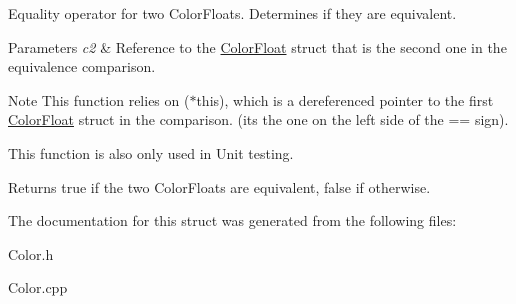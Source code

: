 Equality operator for two Color\+Floats. Determines if they are equivalent. 
\begin{DoxyParams}{Parameters}
{\em c2} & Reference to the \hyperlink{structtsgl_1_1_color_float}{Color\+Float} struct that is the second one in the equivalence comparison. \\
\hline
\end{DoxyParams}
\begin{DoxyNote}{Note}
This function relies on ($\ast$this), which is a dereferenced pointer to the first \hyperlink{structtsgl_1_1_color_float}{Color\+Float} struct in the comparison. (its the one on the left side of the == sign). 

This function is also only used in Unit testing. 
\end{DoxyNote}
\begin{DoxyReturn}{Returns}
true if the two Color\+Floats are equivalent, false if otherwise. 
\end{DoxyReturn}


The documentation for this struct was generated from the following files\+:\begin{DoxyCompactItemize}
\item 
Color.\+h\item 
Color.\+cpp\end{DoxyCompactItemize}
